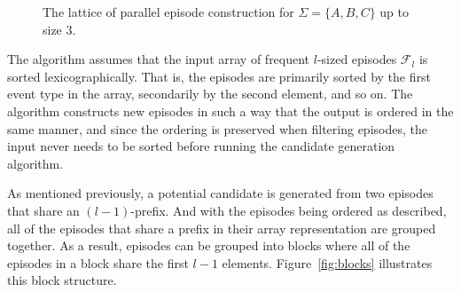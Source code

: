 \begin{figure}
\centering


\caption{The lattice of parallel episode construction for $ \Sigma = \{ A, B, C \} $ up to size 3.}

\label{fig:parallel-episode-lattice}
\end{figure}

The algorithm assumes that the input array of frequent $ l $-sized episodes $ \mathcal{F}_l $ is sorted lexicographically. That is, the episodes are primarily sorted by the first event type in the array, secondarily by the second element, and so on. The algorithm constructs new episodes in such a way that the output is ordered in the same manner, and since the ordering is preserved when filtering episodes, the input never needs to be sorted before running the candidate generation algorithm.

As mentioned previously, a potential candidate is generated from two episodes that share an $ (l - 1) $-prefix. And with the episodes being ordered as described, all of the episodes that share a prefix in their array representation are grouped together. As a result, episodes can be grouped into blocks where all of the episodes in a block share the first $ l - 1 $ elements. Figure~\ref{fig:blocks} illustrates this block structure.



